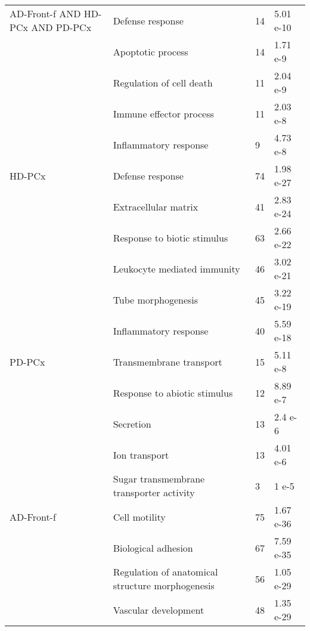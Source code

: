 \begin{table}[!ht]
\begin{tabularx}{13cm}{L{2cm}L{4.5cm}L{3cm}C{1.5cm}}
AD-Front-f AND HD-PCx AND PD-PCx       & Defense response                                   & 14                         & 5.01 e-10        \\
                      & Apoptotic process                           & 14  & 1.71 e-9   \\
                      & Regulation of cell death                      & 11  & 2.04 e-9   \\
                      & Immune effector process                     & 11  & 2.03 e-8   \\
                      & Inflammatory response                         & 9   & 4.73 e-8   \\
HD-PCx                & Defense response                              & 74  & 1.98 e-27  \\
                      & Extracellular matrix                          & 41  & 2.83 e-24  \\
                      & Response to biotic stimulus                 & 63  & 2.66 e-22  \\
                      & Leukocyte mediated immunity                 & 46  & 3.02 e-21  \\
                      & Tube morphogenesis                          & 45  & 3.22 e-19  \\
                      & Inflammatory response                         & 40  & 5.59 e-18  \\
PD-PCx                & Transmembrane transport                     & 15  & 5.11 e-8   \\
                      & Response to abiotic stimulus                & 12  & 8.89 e-7   \\
                      & Secretion                                     & 13  & 2.4 e-6    \\
                      & Ion transport                               & 13  & 4.01 e-6   \\
                      & Sugar transmembrane transporter activity    & 3   & 1 e-5      \\
AD-Front-f            & Cell motility                                 & 75  & 1.67 e-36  \\
                      & Biological adhesion                         & 67  & 7.59 e-35  \\
                                       & Regulation of anatomical structure morphogenesis & 56                         & 1.05 e-29        \\
                      & Vascular development                        & 48  & 1.35 e-29  \\

\end{tabularx}
\end{table}
